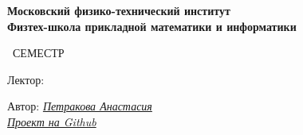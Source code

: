 \begin{titlepage}
	\clearpage\thispagestyle{empty}
	\centering
	
	\textbf{Московский физико-технический институт \\ Физтех-школа прикладной математики и информатики}
	\vspace{50pt}
	
	{\textbf{\FullCourseNameFirstPart}}
	
	\SemesterNumber\ СЕМЕСТР  
	\vspace{1ex}
	
	Лектор: \textit{\LecturerInitials}
	
    \vspace{10pt}

    \vfill
	\begin{flushright}
		\noindent
		Автор:
        \href{https://t.me/Imia_Familiia}{\textit{Петракова Анастасия}}
		\\
		\href{\GithubLink}{\textit{Проект на Github}}
	\end{flushright}
	\vfill
	\CourseDate
	\pagebreak
\end{titlepage}

